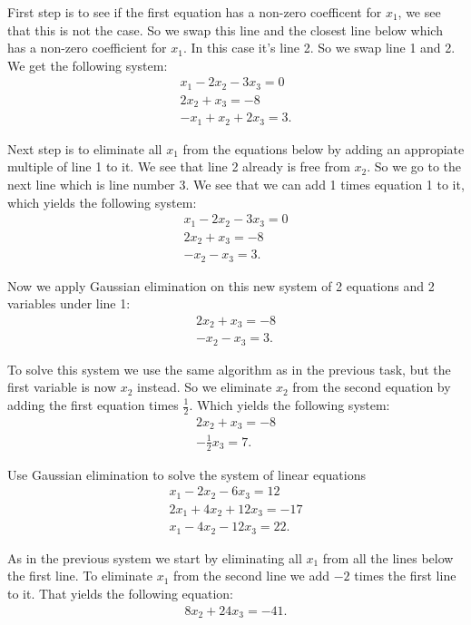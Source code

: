 \documentclass[10pt]{article}
\begin{document}
\begin{solution}[]  \label{sol:}
First step is to see if the first equation has a non-zero coefficent for
\(x_1\), we see that this is not the case. So we swap this line and the closest
line below which has a non-zero coefficient for \(x_1\). In this case it's
line 2. So we swap line 1 and 2. We get the following system:
\begin{align*}
x_1 - 2x_2 - 3x_3 = 0 \\
2x_2 + x_3 = -8 \\
-x_1 + x_2 + 2x_3 = 3
.
\end{align*}

Next step is to eliminate all \(x_1\) from the equations below by adding
an appropiate multiple of line 1 to it. We see that line 2 already is
free from \(x_2\). So we go to the next line which is line number 3. We see
that we can add 1 times equation 1 to it, which yields the following
system:
\begin{align*}
x_1 - 2x_2 - 3x_3 = 0 \\
2x_2 + x_3 = -8 \\
-x_2 - x_3 = 3
.
\end{align*}

Now we apply Gaussian elimination on this new system of 2 equations and
2 variables under line 1:
\begin{align*}
2x_2 + x_3 = -8 \\
-x_2 - x_3 = 3
.
\end{align*}

To solve this system we use the same algorithm as in the previous task, but the
first variable is now \(x_2\) instead. So we eliminate \(x_2\) from the second equation
by adding the first equation times \(\frac{1}{2}\). Which yields the following system:
\begin{align*}
2x_2 + x_3 = -8 \\
- \frac{1}{2} x_3 = 7
.
\end{align*}


\end{solution}
\begin{exercise}[System 3]  \label{exe:System_3}
Use Gaussian elimination to solve the system of linear equations
\begin{align*}
x_1 - 2x_2 -6x_3 = 12 \\
2x_1 + 4x_2 + 12x_3 = -17 \\
x_1 - 4x_2 - 12x_3 = 22
.
\end{align*}
\end{exercise}
\begin{solution}[]  \label{sol:}
As in the previous system we start by eliminating all \(x_1\) from
all the lines below the first line.
To eliminate \(x_1\) from the second line we add \(-2\) times the first line
to it. That yields the following equation:
\begin{align*}
8x_2 + 24x_3 = -41
.
\end{align*}

\end{solution}
\end{document}
